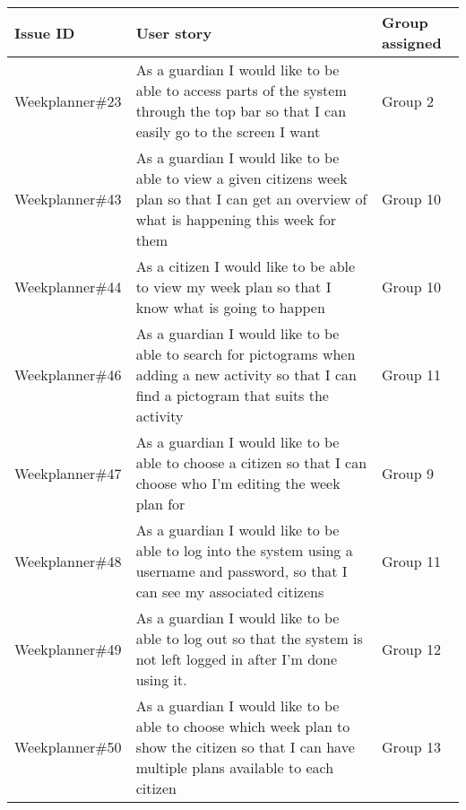 \begin{longtable}{|p{2.8cm}|p{7cm}|p{2cm}|}
    \hline
    Issue ID        & User story                                                                                                                                                                               & Group assigned      \\ \hline
    Weekplanner\#23 & As a guardian I would like to be able to access parts of the system through the top bar so that I can easily go to the screen I want                                                     & Group 2             \\ \hline
    Weekplanner\#43 & As a guardian I would like to be able to view a given citizens week plan so that I can get an overview of what is happening this week for them                                           & Group 10            \\ \hline
    Weekplanner\#44 & As a citizen I would like to be able to view my week plan so that I know what is going to happen                                                                                         & Group 10            \\ \hline
    Weekplanner\#46 & As a guardian I would like to be able to search for pictograms when adding a new activity so that I can find a pictogram that suits the activity                                         & Group 11            \\ \hline
    Weekplanner\#47 & As a guardian I would like to be able to choose a citizen so that I can choose who I’m editing the week plan for                                                                         & Group 9             \\ \hline
    Weekplanner\#48 & As a guardian I would like to be able to log into the system using a username and password, so that I can see my associated citizens                                                     & Group 11            \\ \hline
    Weekplanner\#49 & As a guardian I would like to be able to log out so that the system is not left logged in after I’m done using it.                                                                       & Group 12            \\ \hline
    Weekplanner\#50 & As a guardian I would like to be able to choose which week plan to show the citizen so that I can have multiple plans available to each citizen                                          & Group 13            \\ \hline

\end{longtable}
